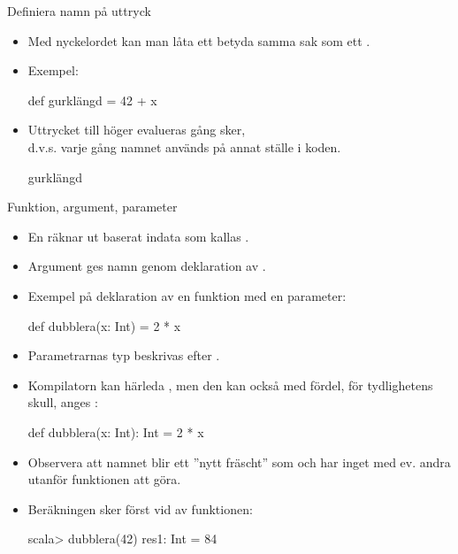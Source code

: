 
\begin{Slide}{Definiera namn på uttryck}
\begin{itemize}
\item Med nyckelordet  kan man låta ett  betyda samma sak som ett .
\item Exempel:
\begin{Code}
def gurklängd = 42 + x
\end{Code}
\item Uttrycket till höger evalueras  gång  sker,\\
d.v.s. varje gång namnet används på annat ställe i koden.
\begin{Code}
gurklängd
\end{Code}

\end{itemize}
\end{Slide}

\begin{Slide}{Funktion, argument, parameter}\SlideFontSmall
\begin{itemize}
\item En  räknar ut  baserat indata som kallas .

\item Argument ges namn genom deklaration av .

\item Exempel på deklaration av en funktion med en parameter:
\begin{Code}
def dubblera(x: Int) = 2 * x
\end{Code}

\item Parametrarnas typ  beskrivas efter .
\item Kompilatorn kan härleda , men den kan också med fördel, för tydlighetens skull, anges :
\begin{Code}
def dubblera(x: Int): Int = 2 * x
\end{Code}

\item Observera att namnet  blir ett ''nytt fräscht''  som  och har inget med ev. andra  utanför funktionen att göra.

\item Beräkningen sker först vid  av funktionen:
\begin{REPL}
scala> dubblera(42)
res1: Int = 84
\end{REPL}

\end{itemize}
\end{Slide}






